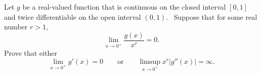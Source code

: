 Let $g$ be a real-valued function that is continuous on the closed interval $[0,1]$ and twice differentiable on the open interval $(0,1)$.  Suppose that for some real number $r>1$,
\[
\lim_{x\to 0^+}\frac{g(x)}{x^r} = 0.
\]Prove that either
\[
\lim_{x\to 0^+}g'(x) = 0\qquad\text{or}\qquad \limsup_{x\to 0^+}x^r|g''(x)|= \infty.
\]